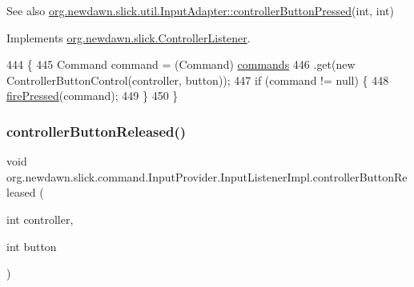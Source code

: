 \begin{DoxySeeAlso}{See also}
\mbox{\hyperlink{classorg_1_1newdawn_1_1slick_1_1util_1_1_input_adapter_ad51a716fce13f062b7bef542c2d7641a}{org.\+newdawn.\+slick.\+util.\+Input\+Adapter\+::controller\+Button\+Pressed}}(int, int) 
\end{DoxySeeAlso}


Implements \mbox{\hyperlink{interfaceorg_1_1newdawn_1_1slick_1_1_controller_listener_ae6feac165a8d0eded01f38de12f239ff}{org.\+newdawn.\+slick.\+Controller\+Listener}}.


\begin{DoxyCode}
444                                                                         \{
445             Command command = (Command) \mbox{\hyperlink{classorg_1_1newdawn_1_1slick_1_1command_1_1_input_provider_ab2bd0c08506a59bc7457d7a87cf873d2}{commands}}
446                     .\textcolor{keyword}{get}(\textcolor{keyword}{new} ControllerButtonControl(controller, button));
447             \textcolor{keywordflow}{if} (command != null) \{
448                 \mbox{\hyperlink{classorg_1_1newdawn_1_1slick_1_1command_1_1_input_provider_a82cd36086b5780ccce446717e8075e96}{firePressed}}(command);
449             \}
450         \}
\end{DoxyCode}
\mbox{\label{classorg_1_1newdawn_1_1slick_1_1command_1_1_input_provider_1_1_input_listener_impl_a32ba61e40693153639ad65623c4e9f4c}} 
\subsubsection{\texorpdfstring{controller\+Button\+Released()}{controllerButtonReleased()}}
{\footnotesize\ttfamily void org.\+newdawn.\+slick.\+command.\+Input\+Provider.\+Input\+Listener\+Impl.\+controller\+Button\+Released (\begin{DoxyParamCaption}\item[{int}]{controller,  }\item[{int}]{button }\end{DoxyParamCaption})\hspace{0.3cm}{\ttfamily [inline]}}

